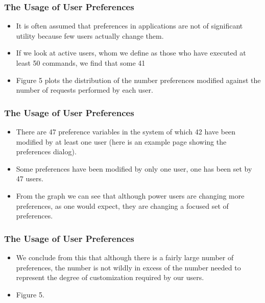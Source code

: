 \documentclass{beamer}
\begin{document}
\begin{frame}
\frametitle{The Usage of User Preferences}

\begin{itemize}
\item It is often assumed that preferences in applications are not of significant utility because few users actually change them.
\item If we look at active users, whom we define as those who have executed at least 50 commands, we find that some 41%
\item Figure 5 plots the distribution of the number preferences modified against the number of requests performed by each user.
\end{itemize}

\end{frame}

\begin{frame}
\frametitle{The Usage of User Preferences}

\begin{itemize}
\item There are 47 preference variables in the system of which 42 have been modified by at least one user (here is an example page showing the preferences dialog).
\item Some preferences have been modified by only one user, one has been set by 47 users.
\item From the graph we can see that although power users are changing more preferences, as one would expect, they are changing a focused set of preferences.
\end{itemize}

\end{frame}

\begin{frame}
\frametitle{The Usage of User Preferences}

\begin{itemize}
\item We conclude from this that although there is a fairly large number of preferences, the number is not wildly in excess of the number needed to represent the degree of customization required by our users.
\item Figure 5.
\end{itemize}

\end{frame}
\end{document}
